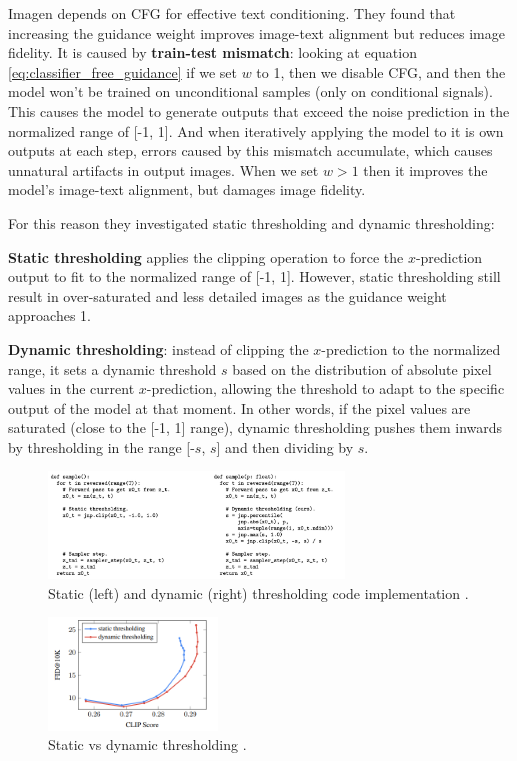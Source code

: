 Imagen depends on CFG for effective text conditioning. They found that increasing the guidance weight improves image-text alignment but reduces image fidelity. It is caused by \textbf{train-test mismatch}: looking at equation \ref{eq:classifier_free_guidance} if we set $w$ to 1, then we disable CFG, and then the model won't be trained on unconditional samples (only on conditional signals). This causes the model to generate outputs that exceed the noise prediction in the normalized range of [-1, 1]. And when iteratively applying the model to it is own outputs at each step, errors caused by this mismatch accumulate, which causes unnatural artifacts in output images. When we set $w>1$ then it improves the model's image-text alignment, but damages image fidelity.

For this reason they investigated static thresholding and dynamic thresholding:

\textbf{Static thresholding} applies the clipping operation to force the $x$-prediction output to fit to the normalized range of [-1, 1]. However, static thresholding still result in over-saturated and less detailed images as the guidance weight approaches 1.

\textbf{Dynamic thresholding}: instead of clipping the $x$-prediction to the normalized range, it sets a dynamic threshold $s$ based on the distribution of absolute pixel values in the current $x$-prediction, allowing the threshold to adapt to the specific output of the model at that moment. In other words, if the pixel values are saturated (close to the [-1, 1] range), dynamic thresholding pushes them inwards by thresholding in the range [-$s$, $s$] and then dividing by $s$.

\begin{figure}
    \centering
    \includegraphics[width=0.7\textwidth]{images/imagen/static_dynamic_thresholding.png}
    \caption{Static (left) and dynamic (right) thresholding code implementation \cite{imagen}.}
    \label{fig:imagen_dynamic_thresholding}
\end{figure}

\begin{figure}
    \centering
    \includegraphics[width=0.4\textwidth]{images/imagen/static_vs_dynamic_thresholding.png}
    \caption{Static vs dynamic thresholding \cite{imagen}.}
    \label{fig:imagen_static_vs_dynamic_thresholding}
\end{figure}

